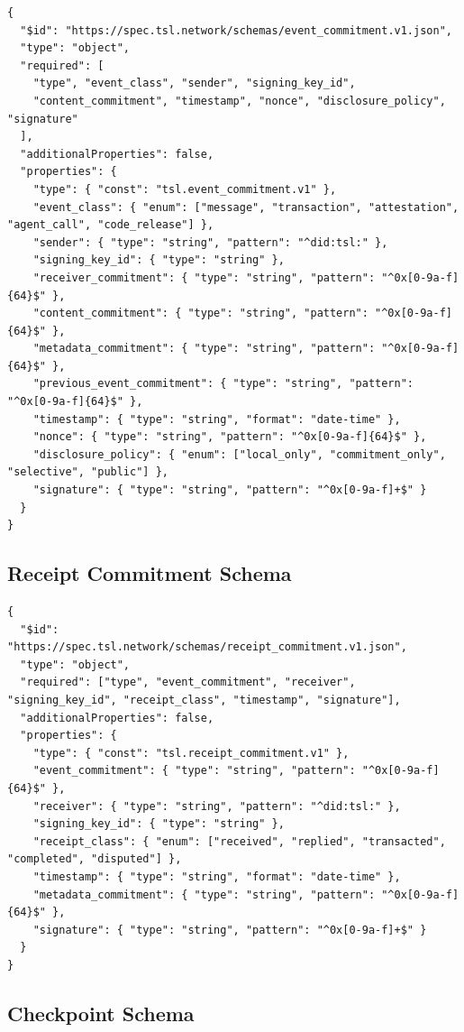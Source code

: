 \documentclass[11pt]{article}
\begin{document}
\begin{lstlisting}[style=tslcode]
{
  "$id": "https://spec.tsl.network/schemas/event_commitment.v1.json",
  "type": "object",
  "required": [
    "type", "event_class", "sender", "signing_key_id",
    "content_commitment", "timestamp", "nonce", "disclosure_policy", "signature"
  ],
  "additionalProperties": false,
  "properties": {
    "type": { "const": "tsl.event_commitment.v1" },
    "event_class": { "enum": ["message", "transaction", "attestation", "agent_call", "code_release"] },
    "sender": { "type": "string", "pattern": "^did:tsl:" },
    "signing_key_id": { "type": "string" },
    "receiver_commitment": { "type": "string", "pattern": "^0x[0-9a-f]{64}$" },
    "content_commitment": { "type": "string", "pattern": "^0x[0-9a-f]{64}$" },
    "metadata_commitment": { "type": "string", "pattern": "^0x[0-9a-f]{64}$" },
    "previous_event_commitment": { "type": "string", "pattern": "^0x[0-9a-f]{64}$" },
    "timestamp": { "type": "string", "format": "date-time" },
    "nonce": { "type": "string", "pattern": "^0x[0-9a-f]{64}$" },
    "disclosure_policy": { "enum": ["local_only", "commitment_only", "selective", "public"] },
    "signature": { "type": "string", "pattern": "^0x[0-9a-f]+$" }
  }
}
\end{lstlisting}

\subsection{Receipt Commitment Schema}

\begin{lstlisting}[style=tslcode]
{
  "$id": "https://spec.tsl.network/schemas/receipt_commitment.v1.json",
  "type": "object",
  "required": ["type", "event_commitment", "receiver", "signing_key_id", "receipt_class", "timestamp", "signature"],
  "additionalProperties": false,
  "properties": {
    "type": { "const": "tsl.receipt_commitment.v1" },
    "event_commitment": { "type": "string", "pattern": "^0x[0-9a-f]{64}$" },
    "receiver": { "type": "string", "pattern": "^did:tsl:" },
    "signing_key_id": { "type": "string" },
    "receipt_class": { "enum": ["received", "replied", "transacted", "completed", "disputed"] },
    "timestamp": { "type": "string", "format": "date-time" },
    "metadata_commitment": { "type": "string", "pattern": "^0x[0-9a-f]{64}$" },
    "signature": { "type": "string", "pattern": "^0x[0-9a-f]+$" }
  }
}
\end{lstlisting}

\subsection{Checkpoint Schema}
\end{document}
